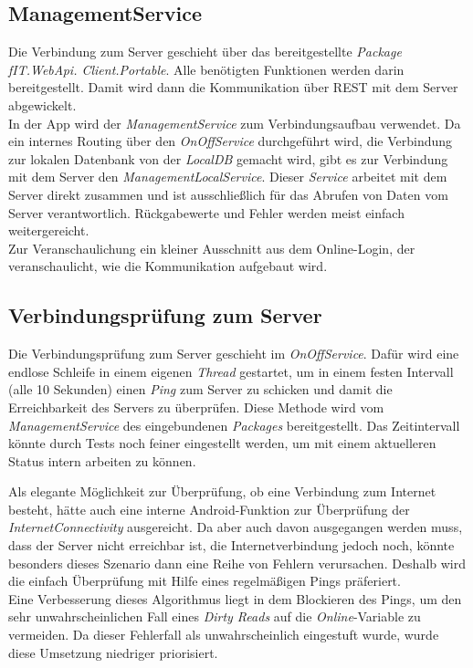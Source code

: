 \subsection{ManagementService}
\label{ssec:nat-ManagementServiceLocal}
Die Verbindung zum Server geschieht über das bereitgestellte \textit{Package}  \textit{fIT.WebApi. Client.Portable}. Alle benötigten Funktionen werden darin bereitgestellt. Damit wird dann die Kommunikation über REST mit dem Server abgewickelt.\\
In der App wird der \textit{ManagementService} zum Verbindungsaufbau verwendet. Da ein internes Routing über den \textit{OnOffService} durchgeführt wird, die Verbindung zur lokalen Datenbank von der \textit{LocalDB} gemacht wird, gibt es zur Verbindung mit dem Server den \textit{ManagementLocalService}. Dieser \textit{Service} arbeitet mit dem Server direkt zusammen und ist ausschließlich für das Abrufen von Daten vom Server verantwortlich. Rückgabewerte und Fehler werden meist einfach weitergereicht.\\
Zur Veranschaulichung ein kleiner Ausschnitt aus dem Online-Login, der veranschaulicht, wie die Kommunikation aufgebaut wird.

\subsection{Verbindungsprüfung zum Server}
\label{ssec:nat-konnektivität}
Die Verbindungsprüfung zum Server geschieht im \textit{OnOffService}. Dafür wird eine endlose Schleife in einem eigenen \textit{Thread} gestartet, um in einem festen Intervall (alle 10 Sekunden) einen \textit{Ping} zum Server zu schicken und damit die Erreichbarkeit des Servers zu überprüfen. Diese Methode wird vom \textit{ManagementService} des eingebundenen \textit{Packages} bereitgestellt. Das Zeitintervall könnte durch Tests noch feiner eingestellt werden, um mit einem aktuelleren Status intern arbeiten zu können.

Als elegante Möglichkeit zur Überprüfung, ob eine Verbindung zum Internet besteht, hätte auch eine interne Android-Funktion zur Überprüfung der \textit{InternetConnectivity} ausgereicht. Da aber auch davon ausgegangen werden muss, dass der Server nicht erreichbar ist, die Internetverbindung jedoch noch, könnte besonders dieses Szenario dann eine Reihe von Fehlern verursachen. Deshalb wird die einfach Überprüfung mit Hilfe eines regelmäßigen Pings präferiert.\\
Eine Verbesserung dieses Algorithmus liegt in dem Blockieren des Pings, um den sehr unwahrscheinlichen Fall eines \textit{Dirty Reads} auf die \textit{Online}-Variable zu vermeiden. Da dieser Fehlerfall als unwahrscheinlich eingestuft wurde, wurde diese Umsetzung niedriger priorisiert.
